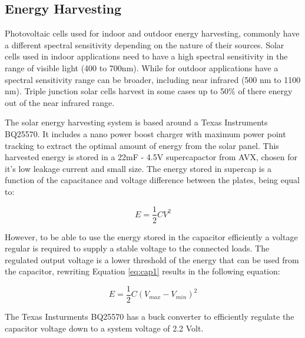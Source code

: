 \documentclass[letterpaper, 10 pt, conference]{ieeeconf}  %
\begin{document}
\subsection{Energy Harvesting}


Photovoltaic cells used for indoor and outdoor energy harvesting, commonly have a different spectral sensitivity depending on the nature of their sources.
Solar cells used in indoor applications need to have a high spectral sensitivity in the range of visible light (400 to 700nm).
While for outdoor applications have a spectral sensitivity range can be broader, including near infrared  (500 nm to 1100 nm).
Triple junction solar cells harvest in some cases up to 50\% of there energy out of the near infrared range.


The solar energy harvesting system is based around a Texas Instruments BQ25570. 
It includes a nano power boost charger with maximum power point tracking to extract the optimal amount of energy from the solar panel. 
This harvested energy is stored in a 22mF - 4.5V supercapactor from AVX, chosen for it's low leakage current and small size.
The energy stored in supercap is a function of the capacitance and voltage difference between the plates, being equal to:

\begin{equation}
\label{eq:cap1}
E = \frac{1}{2}CV^{2}
\end{equation}

However, to be able to use the energy stored in the capacitor efficiently a voltage regular is required to supply a stable voltage to the connected loads.
The regulated output voltage is a lower threshold of the energy that can be used from the capacitor, rewriting Equation \ref{eq:cap1} results in the following equation:

\begin{equation}
\label{eq:cap2}
E = \frac{1}{2}C(V_{max} - V_{min})^{2}
\end{equation}

The Texas Insturments BQ25570 has a buck converter to efficiently regulate the capacitor voltage down to a system voltage of 2.2 Volt.
\end{document}
